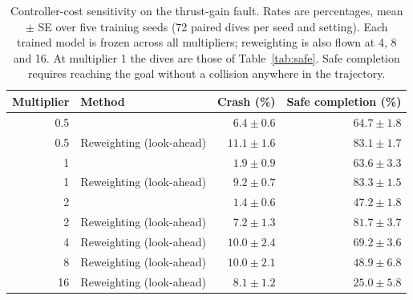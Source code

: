 \begin{table}[t]
\centering
\caption{Controller-cost sensitivity on the thrust-gain fault. Rates are percentages, mean $\pm$ SE over five training seeds (72 paired dives per seed and setting). Each trained model is frozen across all multipliers; reweighting is also flown at 4, 8 and 16. At multiplier 1 the dives are those of Table~\ref{tab:safe}. Safe completion requires reaching the goal without a collision anywhere in the trajectory.}
\label{tab:cost_sensitivity}
\begin{tabular}{rlrr}
\toprule
Multiplier & Method & Crash (\%) & Safe completion (\%) \\
\midrule
0.5 & \method{} & $6.4 \pm 0.6$ & $64.7 \pm 1.8$ \\
0.5 & Reweighting (look-ahead) & $11.1 \pm 1.6$ & $83.1 \pm 1.7$ \\
1 & \method{} & $1.9 \pm 0.9$ & $63.6 \pm 3.3$ \\
1 & Reweighting (look-ahead) & $9.2 \pm 0.7$ & $83.3 \pm 1.5$ \\
2 & \method{} & $1.4 \pm 0.6$ & $47.2 \pm 1.8$ \\
2 & Reweighting (look-ahead) & $7.2 \pm 1.3$ & $81.7 \pm 3.7$ \\
4 & Reweighting (look-ahead) & $10.0 \pm 2.4$ & $69.2 \pm 3.6$ \\
8 & Reweighting (look-ahead) & $10.0 \pm 2.1$ & $48.9 \pm 6.8$ \\
16 & Reweighting (look-ahead) & $8.1 \pm 1.2$ & $25.0 \pm 5.8$ \\
\bottomrule
\end{tabular}
\end{table}
